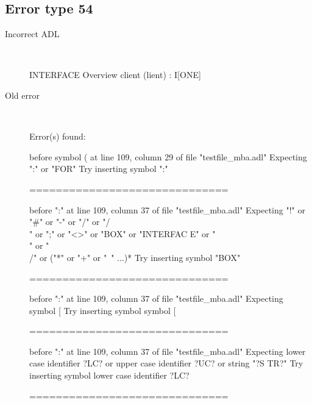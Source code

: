 \hrulefill

\subsection{Error type 54}
  \begin{description}
  \item[Incorrect ADL]~\\
\begin{adl}
INTERFACE Overview {client} (lient) : I[ONE]\end{adl}
  \item[Old error]~\\
\begin{haskell}
Error(s) found:

before symbol ( at line 109, column 29 of file "testfile_mba.adl"
Expecting ":" or "FOR"
Try inserting symbol ":"

==============================

before ":" at line 109, column 37 of file "testfile_mba.adl"
Expecting "!" or "#" or "-" or "/" or "/\\" or ";" or "<>" or "BOX" or "INTERFAC
E" or "\\" or "\\/" or ("*" or "+" or "~" ...)*
Try inserting symbol "BOX"

==============================

before ":" at line 109, column 37 of file "testfile_mba.adl"
Expecting symbol [
Try inserting symbol symbol [

==============================

before ":" at line 109, column 37 of file "testfile_mba.adl"
Expecting lower case identifier ?LC? or upper case identifier ?UC? or string "?S
TR?"
Try inserting symbol lower case identifier ?LC?

==============================


\end{haskell}
\end{description}
